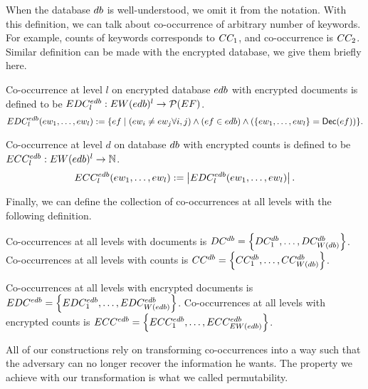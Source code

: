 When the database $db$ is well-understood, we omit it from the notation. With this definition, we can talk about co-occurrence of arbitrary number of keywords. For example, counts of keywords corresponds to $CC_1$, and co-occurrence is $CC_2$. Similar definition can be made with the encrypted database, we give them briefly here.

\begin{definition}
	Co-occurrence at level $l$ on encrypted database $edb$ with encrypted documents is defined to be $EDC_{l}^{edb}: EW(edb)^l \rightarrow \mathcal{P}(EF)$.
	\begin{equation}
	EDC_{l}^{edb}(ew_1, \dots, ew_l) := \{ ef \mid  (ew_i \neq ew_j \forall i,j) \wedge (ef \in edb) \wedge (\{ew_1, \dots, ew_l\} = \mathsf{Dec}(ef)) \}.
	\end{equation}
\end{definition}

\begin{definition}
	Co-occurrence at level $d$ on database $db$ with encrypted counts is defined to be $ECC_{l}^{edb}: EW(edb)^l \rightarrow \mathbb{N}$.
	\begin{equation}
	ECC_{l}^{edb}(ew_1, \dots, ew_l) := \left| EDC_{l}^{edb}(ew_1, \dots, ew_l) \right|.
	\end{equation}
\end{definition}

Finally, we can define the collection of co-occurrences at all levels with the following definition.

\begin{definition}
Co-occurrences at all levels with documents is $DC^{db} = \left\{ DC_1^{db}, \dots, DC_{W(db)}^{db} \right\}$. Co-occurrences at all levels with counts is $CC^{db} = \left\{ CC_1^{db}, \dots, CC_{W(db)}^{db} \right\}$.

Co-occurrences at all levels with encrypted documents is $EDC^{edb} = \left\{ EDC_1^{edb}, \dots, EDC_{W(edb)}^{edb} \right\}$. Co-occurrences at all levels with encrypted counts is $ECC^{edb} = \left\{ ECC_1^{edb}, \dots, ECC_{EW(edb)}^{edb} \right\}$.
\end{definition}

All of our constructions rely on transforming co-occurrences into a way such that the adversary can no longer recover the information he wants. The property we achieve with our transformation is what we called permutability.

